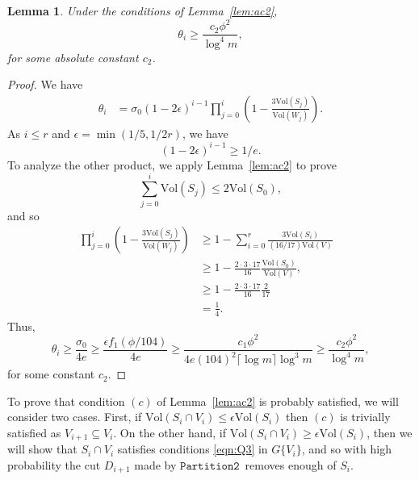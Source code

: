 \documentclass[11pt]{article}
\newtheorem{lemma}[theorem]{Lemma}
\newcommand{\partitiontwo}{\ensuremath{\mathtt{Partition2}}}
\def\intersect{\cap}
\def\intersect{\cap}
\newcommand{\ceiling}[1]{\lceil#1\rceil}
\def\vol#1{\mathrm{Vol}\left(#1  \right)}
\begin{document}
\begin{lemma}\label{lem:ac3}
Under the conditions of Lemma~\ref{lem:ac2},
\[
  \theta_{i} \geq 
\frac{c_{2} \phi^{2}}{\log^{4} m},
\]
for some absolute constant $c_{2}$.
\end{lemma}
\begin{proof}
We have
\begin{align*}
  \theta_{i}
  & = \sigma_{0} (1-2 \epsilon)^{i-1} 
  \prod_{j=0}^{i} \left(1 - \frac{3 \vol{S_{j}}}{\vol{W_{j}}} \right).
\end{align*}
As $i \leq r$ and $\epsilon = \min (1/5, 1/2r)$, we have
\[
  (1-2 \epsilon)^{i-1} \geq 1/e.
\]
To analyze the other product, we apply Lemma~\ref{lem:ac2} to prove
\[
  \sum_{j=0}^{i} \vol{S_{j}} \leq 2 \vol{S_{0}},
\]
and so
\begin{align*}
\prod_{j=0}^{i} \left(1 - \frac{3 \vol{S_{j}}}{\vol{W_{j}}} \right)
& \geq
1 -   \sum_{i = 0}^{r} \frac{3 \vol{S_{i}}}{(16/17)\vol{V}}
\\
& \geq
1 -  \frac{2 \cdot  3 \cdot  17}{16} \frac{\vol{S_{0}}}{\vol{V}},
& 
\\
& \geq
1 -  \frac{2 \cdot  3 \cdot  17}{16} \frac{2}{17}
& 
\\
& = \frac{1}{4}.
\end{align*}
Thus,
\[
\theta_{i} 
\geq 
\frac{\sigma_{0}}{4 e}
\geq 
\frac{\epsilon f_{1} (\phi /104)}{4 e}
\geq 
\frac{c_{1} \phi^{2}}{4 e (104)^{2} \ceiling{\log m} \log^{3} m}
\geq 
\frac{c_{2} \phi^{2}}{\log^{4} m},
\]
for some constant $c_{2}$.
\end{proof}

To prove that condition $(c)$ of Lemma~\ref{lem:ac2} is probably satisfied,
  we will consider two cases.
First, if $\vol{S_{i} \intersect V_{i}} \leq \epsilon \vol{S_{i}}$
  then $(c)$ is trivially satisfied as $V_{i+1} \subseteq V_{i}$.
On the other hand, if $\vol{S_{i} \intersect V_{i}} \geq \epsilon \vol{S_{i}}$,
  then we will show that $S_{i} \intersect V_{i}$ satisfies conditions \eqref{eqn:Q3}
  in $G \{V_{i} \}$, and so 
  with high probability the
  cut $D_{i+1}$ made by 
  \partitiontwo \ removes enough of $S_{i}$.
\end{document}
